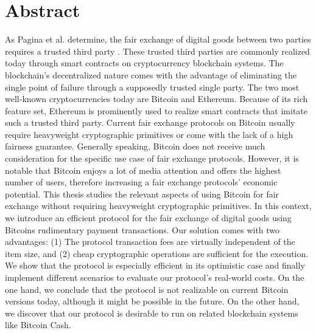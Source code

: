 \documentclass{cacthesis}
\newcounter{protocol}
\begin{document}
	    \section{Abstract}
	    As Pagina et al. determine, the fair exchange of digital goods between two parties requires a trusted third party \cite{Pagnia99onthe}. These trusted third parties are commonly realized today through smart contracts on cryptocurrency blockchain systems. The blockchain's decentralized nature comes with the advantage of eliminating the single point of failure through a supposedly trusted single party. The two most well-known cryptocurrencies today are Bitcoin and Ethereum. Because of its rich feature set, Ethereum is prominently used to realize smart contracts that imitate such a trusted third party. Current fair exchange protocols on Bitcoin usually require heavyweight cryptographic primitives or come with the lack of a high fairness guarantee. Generally speaking, Bitcoin does not receive much consideration for the specific use case of fair exchange protocols. However, it is notable that Bitcoin enjoys a lot of media attention and offers the highest number of users, therefore increasing a fair exchange protocols' economic potential. This thesis studies the relevant aspects of using Bitcoin for fair exchange without requiring heavyweight cryptographic primitives. In this context, we introduce an efficient protocol for the fair exchange of digital goods using Bitcoins rudimentary payment transactions. Our solution comes with two advantages: (1) The protocol transaction fees are virtually independent of the item size, and (2) cheap cryptographic operations are sufficient for the execution. We show that the protocol is especially efficient in its optimistic case and finally implement different scenarios to evaluate our protocol's real-world costs. On the one hand, we conclude that the protocol is not realizable on current Bitcoin versions today, although it might be possible in the future. On the other hand, we discover that our protocol is desirable to run on related blockchain systems like Bitcoin Cash.
	    
\end{document}
